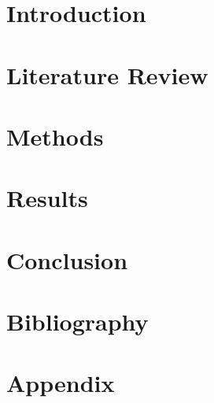 \documentclass[12pt, a4paper, titlepage]{report}
\begin{document}
\newpage
\tableofcontents
\newpage
{}

	\chapter{Introduction}
	
	\chapter{Literature Review}
	
	\chapter{Methods}
	
	\chapter{Results}
	
	\chapter{Conclusion}
	
	\chapter{Bibliography}
		
	\chapter{Appendix}
	
	
\end{document}
